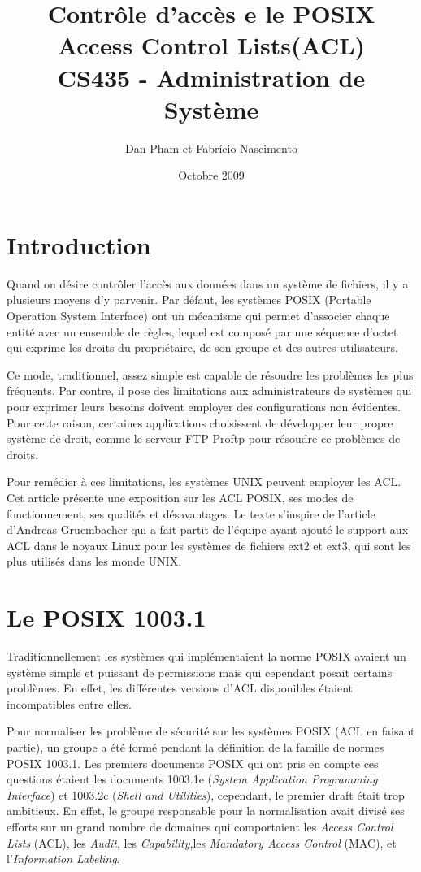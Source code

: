 \documentclass{article}
\title{\textbf{Contrôle d'accès e le POSIX Access Control Lists(ACL)} \\ CS435 - Administration de Système }
\author{Dan Pham et Fabrício Nascimento}
\date{Octobre 2009}
\begin{document}
\maketitle
\newpage
\printindex


\section*{Introduction}
Quand on désire contrôler l'accès aux données dans un système de fichiers, il y a plusieurs moyens d’y parvenir. Par défaut, les systèmes POSIX (Portable Operation System Interface)\cite{ieee1,ieee2} ont un mécanisme qui permet d’associer chaque entité avec un ensemble de règles, lequel est composé par une séquence d'octet qui exprime les droits du propriétaire, de son groupe et des autres utilisateurs.

Ce mode, traditionnel, assez simple est capable de résoudre les problèmes les plus fréquents. Par contre, il pose des limitations aux administrateurs de systèmes qui pour exprimer leurs besoins doivent employer des configurations non évidentes. Pour cette raison, certaines applications choisissent de développer leur propre système de droit, comme le serveur FTP Proftp\cite{ftp} pour résoudre ce problèmes de droits.

Pour remédier à ces limitations, les systèmes UNIX peuvent employer les ACL. Cet article présente une exposition sur les ACL POSIX, ses modes de fonctionnement, ses qualités et désavantages. Le texte s’inspire de l'article d’Andreas Gruembacher\cite{aclsuse} qui a fait partit de l’équipe ayant ajouté le support aux ACL dans le noyaux Linux pour les systèmes de fichiers ext2 et ext3, qui sont les plus utilisés dans les monde UNIX.

\section{Le POSIX 1003.1}
 
Traditionnellement les systèmes qui implémentaient la norme POSIX avaient un système simple et puissant de permissions mais qui cependant posait certains problèmes. En effet, les différentes versions d'ACL disponibles étaient incompatibles entre elles.
 
Pour normaliser les problème de sécurité sur les systèmes POSIX (ACL en faisant partie), un groupe a été formé pendant la définition de la famille de normes POSIX 1003.1. Les premiers documents POSIX qui ont pris en compte ces questions étaient les documents 1003.1e (\emph{System Application Programming Interface}) et 1003.2c (\emph{Shell and Utilities}), cependant, le premier draft était trop ambitieux. En effet, le groupe responsable pour la normalisation avait divisé ses efforts sur un grand nombre de domaines qui comportaient les \emph{Access Control Lists} (ACL), les \emph{Audit}, les \emph{Capability},les \emph{ Mandatory Access Control }(MAC), et l'\emph{Information Labeling}\cite{aclsuse}.
 
\end{document}
